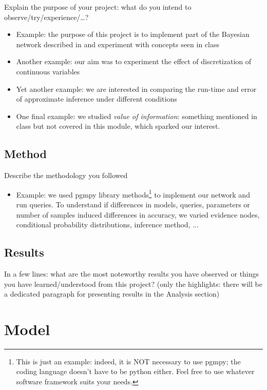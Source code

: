 \documentclass[letterpaper]{article}
\begin{document}
Explain the purpose of your project: what do you intend to observe/try/experience/\dots? \\
\begin{itemize}
\item Example: the purpose of this project is to implement part of the Bayesian network described in \cite{10.1371/journal.pone.0220065} and experiment with concepts seen in class \\
\item Another example: our aim was to experiment the effect of discretization of continuous variables \\
\item Yet another example: we are interested in comparing the run-time and error of approximate inference under different conditions
\item One final example: we studied \textit{value of information}: something mentioned in class but not covered in this module, which sparked our interest.
\end{itemize}


\subsection{Method}

Describe the methodology you followed
\begin{itemize}
    \item Example: we used pgmpy library methods\footnote{This is just an example: indeed, it is NOT necessary to use pgmpy; the coding language doesn't have to be python either. Feel free to use whatever software framework suits your needs.} to implement our network and run queries. To understand if differences in models, queries, parameters or number of samples induced differences in accuracy, we varied evidence nodes, conditional probability distributions, inference method, ...
\end{itemize}

\subsection{Results}

In a few lines: what are the most noteworthy results you have observed or things you have learned/understood from this project? (only the highlights: there will be a dedicated paragraph for presenting results in the Analysis section)


\section{Model}
\end{document}
